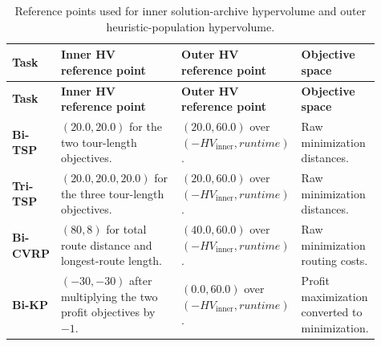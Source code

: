 \begingroup
\small
\renewcommand{\arraystretch}{1.18}
\setlength{\tabcolsep}{4pt}
\begin{longtable}{@{}>{\raggedright\arraybackslash\bfseries}p{0.13\linewidth}>{\raggedright\arraybackslash}p{0.34\linewidth}>{\raggedright\arraybackslash}p{0.26\linewidth}>{\raggedright\arraybackslash}p{0.18\linewidth}@{}}
\caption[Hypervolume reference points]{Reference points used for inner solution-archive hypervolume and outer heuristic-population hypervolume.}
\label{tab:hv-reference-points}\\
\toprule
\normalfont Task & \textbf{Inner HV reference point} & \textbf{Outer HV reference point} & \textbf{Objective space} \\
\midrule
\endfirsthead
\toprule
\normalfont Task & \textbf{Inner HV reference point} & \textbf{Outer HV reference point} & \textbf{Objective space} \\
\midrule
\endhead
Bi-TSP &
$(20.0,20.0)$ for the two tour-length objectives. &
$(20.0,60.0)$ over $(-HV_{\mathrm{inner}}, runtime)$. &
Raw minimization distances. \\
\addlinespace[0.25em]
Tri-TSP &
$(20.0,20.0,20.0)$ for the three tour-length objectives. &
$(20.0,60.0)$ over $(-HV_{\mathrm{inner}}, runtime)$. &
Raw minimization distances. \\
\addlinespace[0.25em]
Bi-CVRP &
$(80,8)$ for total route distance and longest-route length. &
$(40.0,60.0)$ over $(-HV_{\mathrm{inner}}, runtime)$. &
Raw minimization routing costs. \\
\addlinespace[0.25em]
Bi-KP &
$(-30,-30)$ after multiplying the two profit objectives by $-1$. &
$(0.0,60.0)$ over $(-HV_{\mathrm{inner}}, runtime)$. &
Profit maximization converted to minimization. \\
\bottomrule
\end{longtable}
\endgroup
